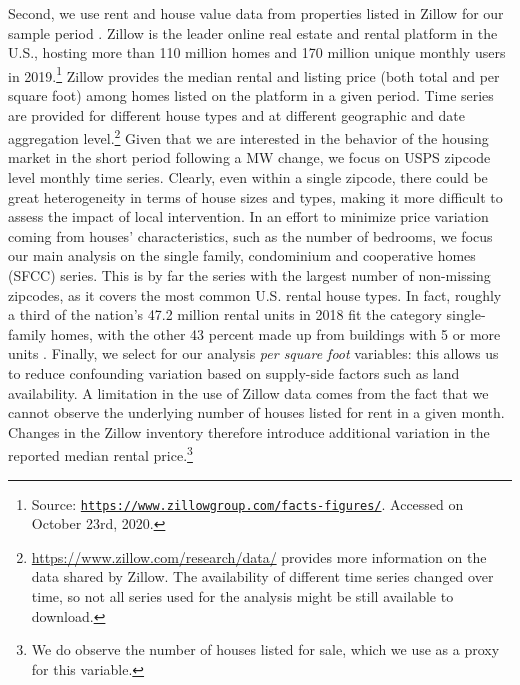 Second, we use rent and house value data from properties listed in Zillow for our sample period 
\parencite{zillow}. Zillow is the leader online real estate and rental platform in the U.S., 
hosting more than 110 million homes and 170 million unique monthly users in 2019.\footnote{
	Source: \href{https://www.zillowgroup.com/facts-figures/}
	{\texttt{https://www.zillowgroup.com/facts-figures/}}. Accessed on October 23rd, 2020.}
Zillow provides the median rental and listing price (both total and per square foot) among homes 
listed on the platform in a given period. Time series are provided for different 
house types and at different geographic and date aggregation level.\footnote{
	\href{https://www.zillow.com/research/data/}{https://www.zillow.com/research/data/} 
	provides more information on the data shared by Zillow. The availability of different time 
	series changed over time, so not all series used for the analysis might be still available 
	to download.}
Given that we are interested in the behavior of the housing market in the short period following a 
MW change, we focus on USPS zipcode level monthly time series. Clearly, even within a single 
zipcode, there could be great heterogeneity in terms of house sizes and types, making it more 
difficult to assess the impact of local intervention. In an effort to minimize price variation 
coming from houses' characteristics, such as the number of bedrooms, we focus our main analysis 
on the single family, condominium and cooperative homes (SFCC) series. This is by far the series 
with the largest number of non-missing zipcodes, as it covers the most common U.S. rental house 
types. In fact, roughly a third of the nation's 47.2 million rental units in 2018 fit the category 
single-family homes, with the other 43 percent made up from buildings with 5 or more units 
\parencite{JCHS2020}. Finally, we select for our analysis \textit{per square foot} variables: 
this allows us to reduce confounding variation based on supply-side factors such as land 
availability. A limitation in the use of Zillow data comes from the fact that we cannot observe the 
underlying number of houses listed for rent in a given month. Changes in the Zillow inventory 
therefore introduce additional variation in the reported median rental price.\footnote{We do
	observe the number of houses listed for sale, which we use as a proxy for this variable.}

